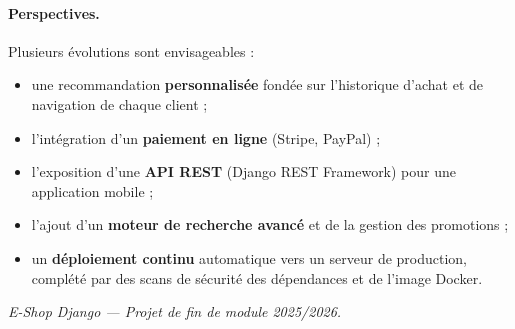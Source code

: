 \documentclass[11pt,a4paper]{report}
\begin{document}
\paragraph{Perspectives.} Plusieurs évolutions sont envisageables :
\begin{itemize}[leftmargin=1.4em]
  \item une recommandation \textbf{personnalisée} fondée sur l'historique d'achat
        et de navigation de chaque client ;
  \item l'intégration d'un \textbf{paiement en ligne} (Stripe, PayPal) ;
  \item l'exposition d'une \textbf{API REST} (Django REST Framework) pour une
        application mobile ;
  \item l'ajout d'un \textbf{moteur de recherche avancé} et de la gestion des
        promotions ;
  \item un \textbf{déploiement continu} automatique vers un serveur de production,
        complété par des scans de sécurité des dépendances et de l'image Docker.
\end{itemize}

\vfill
\begin{center}\itshape
E-Shop Django — Projet de fin de module 2025/2026.
\end{center}
\end{document}

